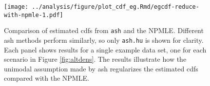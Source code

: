 \documentclass[11pt]{article}
\def\ash{{\tt ash}\xspace}
\begin{document}
\begin{figure}[h!] 
\begin{center}
	\texttt{[image: ../analysis/figure/plot\_cdf\_eg.Rmd/egcdf-reduce-with-npmle-1.pdf]}
	\caption{Comparison of estimated cdfs from \ash and the NPMLE. Different ash methods perform similarly, so only {\tt ash.hu} is shown for clarity. Each panel shows results for a single example data set, one for each scenario in Figure \ref{fig:altdens}. The results illustrate how the unimodal assumption made by ash regularizes the estimated cdfs compared with the NPMLE.} \label{fig:egcdf}
\end{center}
\end{figure}



 
\end{document}
